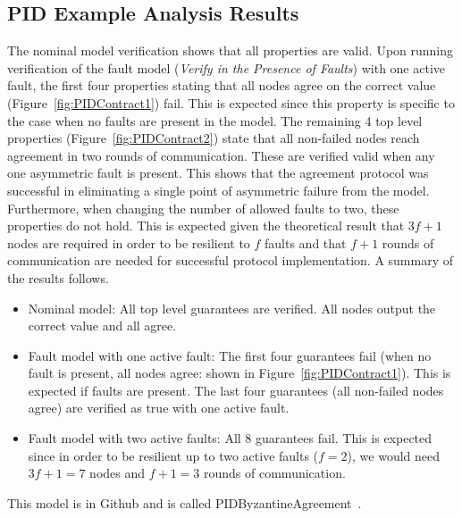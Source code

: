 \subsection{PID Example Analysis Results}
The nominal model verification shows that all properties are valid. Upon running verification of the fault model (\textit{Verify in the Presence of Faults}) with one active fault, the first four properties stating that all nodes agree on the correct value (Figure~\ref{fig:PIDContract1}) fail. This is expected since this property is specific to the case when no faults are present in the model. The remaining 4 top level properties (Figure~\ref{fig:PIDContract2}) state that all non-failed nodes reach agreement in two rounds of communication. These are verified valid when any one asymmetric fault is present. This shows that the agreement protocol was successful in eliminating a single point of asymmetric failure from the model. Furthermore, when changing the number of allowed faults to two, these properties do not hold. This is expected given the theoretical result that $3f+1$ nodes are required in order to be resilient to $f$ faults and that $f+1$ rounds of communication are needed for successful protocol implementation. %
A summary of the results follows. 
\begin{itemize}
	\item Nominal model: All top level guarantees are verified. All nodes output the correct value and all agree. 
	\item Fault model with one active fault: The first four guarantees fail (when no fault is present, all nodes agree: shown in Figure~\ref{fig:PIDContract1}). This is expected if faults are present. The last four guarantees (all non-failed nodes agree) are verified as true with one active fault. 
	\item Fault model with two active faults: All 8 guarantees fail. This is expected since in order to be resilient up to two active faults ($f=2$), we would need $3f + 1 = 7$ nodes and $f+1 = 3$ rounds of communication. 
\end{itemize}
This model is in Github and is called PIDByzantineAgreement~\cite{SAGithub}.



